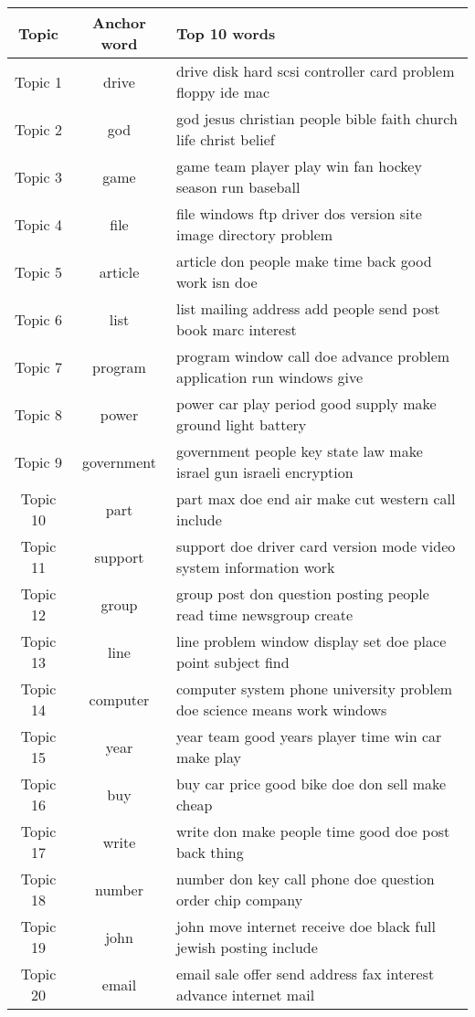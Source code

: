 \documentclass{article}
\begin{document}
\begin{table}[h]
   \begin{center}
  \begin{tabular}{|c|c|l|} \hline
           Topic & Anchor word & Top 10 words \\ \hline
Topic	1	&	drive & drive disk hard scsi controller card problem floppy ide mac	\\ \hline
Topic	2	&	god & god jesus christian people bible faith church life christ belief	\\ \hline
Topic	3	&	game & game team player play win fan hockey season run baseball	\\ \hline
Topic	4	&	file & file windows ftp driver dos version site image directory problem	\\ \hline
Topic	5	&	article & article don people make time back good work isn doe	\\ \hline
Topic	6	&	list & list mailing address add people send post book marc interest	\\ \hline
Topic	7	&	program & program window call doe advance problem application run windows give	\\ \hline
Topic	8	&	power & power car play period good supply make ground light battery	\\ \hline
Topic	9	&	government & government people key state law make israel gun israeli encryption	\\ \hline
Topic	10	&	part & part max doe end air make cut western call include	\\ \hline
Topic	11	&	support & support doe driver card version mode video system information work	\\ \hline
Topic	12	&	group & group post don question posting people read time newsgroup create	\\ \hline
Topic	13	&	line & line problem window display set doe place point subject find	\\ \hline
Topic	14	&	computer & computer system phone university problem doe science means work windows	\\ \hline
Topic	15	&	year & year team good years player time win car make play	\\ \hline
Topic	16	&	buy & buy car price good bike doe don sell make cheap	\\ \hline
Topic	17	&	write & write don make people time good doe post back thing	\\ \hline
Topic	18	&	number & number don key call phone doe question order chip company	\\ \hline
Topic	19	&	john & john move internet receive doe black full jewish posting include	\\ \hline
Topic	20	&	email & email sale offer send address fax interest advance internet mail	\\ \hline


          \end{tabular}

       \label{tab:M700 topics}
   \end{center}
\vspace{-10pt}
\end{table}
\end{document}

